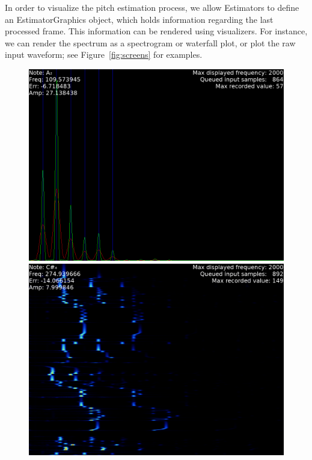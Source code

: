 \documentclass[a4paper,10pt,twocolumn]{article}
\begin{document}
In order to visualize the pitch estimation process, we allow Estimators to define an EstimatorGraphics object, which holds information regarding the last processed frame. This information can be rendered using visualizers. For instance, we can render the spectrum as a spectrogram or waterfall plot, or plot the raw input waveform; see Figure~\ref{fig:screens} for examples.
\begin{figure}[h]
    \centering
        \includegraphics[width=\linewidth]{fig/digi_spec.png}
        \includegraphics[width=\linewidth]{fig/digi_water.png}

\end{figure}
\end{document}

